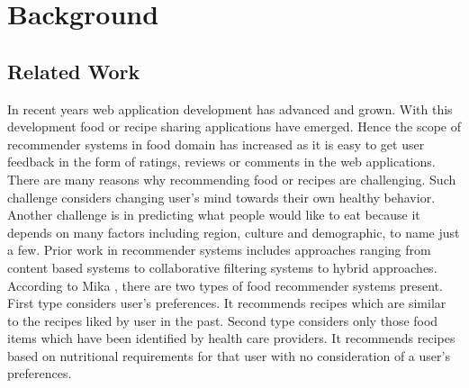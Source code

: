 \chapter{Background}
\section{Related Work}

In recent years web application development has advanced and grown. With this development food or recipe sharing applications have emerged. Hence the scope of recommender systems in food domain has increased as it is easy to get user feedback in the form of ratings, reviews or comments in the web applications.
\\
\noindent There are many reasons why recommending food or recipes are challenging. Such challenge considers changing user's mind towards their own healthy behavior. Another challenge is in predicting what people would like to eat because it depends on many factors including region, culture and demographic, to name just a few. Prior work in recommender systems includes approaches ranging from content based systems to collaborative filtering systems to hybrid approaches. 
\\

\noindent According to Mika \cite{44}, there are two types of food recommender systems present. First type considers user's preferences. It recommends recipes which are similar to the recipes liked by user in the past. Second type considers only those food items which have been identified by health care providers. It recommends recipes based on nutritional requirements for that user with no consideration of a user's preferences.
\\

